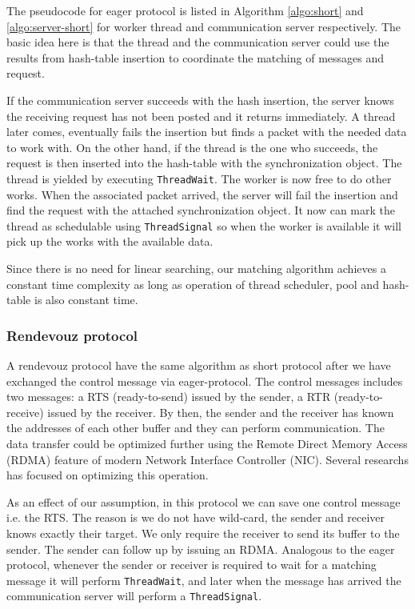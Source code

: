 The pseudocode for eager protocol is listed in Algorithm \ref{algo:short} and
\ref{algo:server-short} for worker thread and communication server
respectively. The basic idea here is that the thread and the communication
server could use the results from hash-table insertion to coordinate the
matching of messages and request. 

If the communication server succeeds with the hash insertion, the server knows
the receiving request has not been posted and it returns immediately. A thread
later comes, eventually fails the insertion but finds a packet with the needed
data to work with. On the other hand, if the thread is the one who succeeds,
the request is then inserted into the hash-table with the synchronization
object.  The thread is yielded by executing \texttt{ThreadWait}. The worker is
now free to do other works. When the associated packet arrived, the server will
fail the insertion and find the request with the attached synchronization
object. It now can mark the thread as schedulable using \texttt{ThreadSignal}
so when the worker is available it will pick up the works with the available
data.

Since there is no need for linear searching, our matching algorithm achieves a
constant time complexity as long as operation of thread scheduler, pool and
hash-table is also constant time.

\subsubsection{Rendevouz protocol}
A rendevouz protocol have the same algorithm as short protocol after we have
exchanged the control message via eager-protocol. The control messages 
includes two messages: a RTS (ready-to-send) issued by the sender, a RTR
(ready-to-receive) issued by the receiver. By then, the sender and the receiver
has known the addresses of each other buffer and they can perform
communication.  The data transfer could be optimized further using the
Remote Direct Memory Access (RDMA) feature of modern Network Interface
Controller (NIC).  Several researchs has focused on optimizing this operation.

As an effect of our assumption, in this protocol we can save one control
message i.e. the RTS.  The reason is we do not have wild-card, the sender and
receiver knows exactly their target.  We only require the receiver to send its
buffer to the sender. The sender can follow up by issuing an RDMA.  Analogous
to the eager protocol, whenever the sender or receiver is required to wait for
a matching message it will perform \texttt{ThreadWait}, and later when the
message has arrived the communication server will perform a
\texttt{ThreadSignal}.


